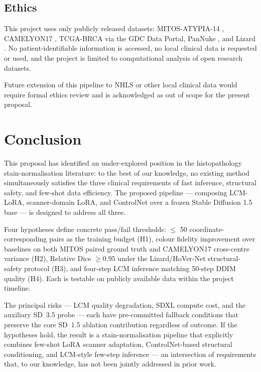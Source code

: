 \documentclass[a4paper,twoside,12pt]{report}
\begin{document}
\section{Ethics}
\label{sec:ethics}

This project uses only publicly released datasets: MITOS-ATYPIA-14 \citep{roux2014mitos}, CAMELYON17 \citep{bandi2018camelyon17}, TCGA-BRCA via the GDC Data Portal, PanNuke \citep{gamper2019pannuke}, and Lizard \citep{graham2021lizard}. No patient-identifiable information is accessed, no local clinical data is requested or used, and the project is limited to computational analysis of open research datasets.

Future extension of this pipeline to NHLS or other local clinical data would require formal ethics review and is acknowledged as out of scope for the present proposal.

\clearpage
\chapter{Conclusion}

This proposal has identified an under-explored position in the histopathology stain-normalisation literature: to the best of our knowledge, no existing method simultaneously satisfies the three clinical requirements of fast inference, structural safety, and few-shot data efficiency. The proposed pipeline --- composing LCM-LoRA, scanner-domain LoRA, and ControlNet over a frozen Stable Diffusion 1.5 base --- is designed to address all three.

Four hypotheses define concrete pass/fail thresholds: $\leq$ 50 coordinate-corresponding pairs as the training budget (H1), colour fidelity improvement over baselines on both MITOS paired ground truth and CAMELYON17 cross-centre variance (H2), Relative Dice $\geq 0.95$ under the Lizard/HoVer-Net structural-safety protocol (H3), and four-step LCM inference matching 50-step DDIM quality (H4). Each is testable on publicly available data within the project timeline.

The principal risks --- LCM quality degradation, SDXL compute cost, and the auxiliary SD~3.5 probe --- each have pre-committed fallback conditions that preserve the core SD~1.5 ablation contribution regardless of outcome. If the hypotheses hold, the result is a stain-normalisation pipeline that explicitly combines few-shot LoRA scanner adaptation, ControlNet-based structural conditioning, and LCM-style few-step inference --- an intersection of requirements that, to our knowledge, has not been jointly addressed in prior work.
\end{document}
